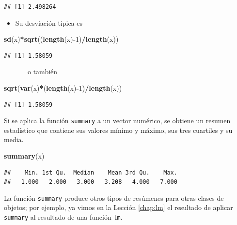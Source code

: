 \documentclass[]{book}
\newenvironment{Shaded}{\begin{snugshade}}{\end{snugshade}}
\newcommand{\DecValTok}[1]{\textcolor[rgb]{0.00,0.00,0.81}{#1}}
\newcommand{\KeywordTok}[1]{\textcolor[rgb]{0.13,0.29,0.53}{\textbf{#1}}}
\newcommand{\NormalTok}[1]{#1}
\newcommand{\OperatorTok}[1]{\textcolor[rgb]{0.81,0.36,0.00}{\textbf{#1}}}
\providecommand{\tightlist}{%
  \setlength{\itemsep}{0pt}\setlength{\parskip}{0pt}}
\theoremstyle{definition}
\theoremstyle{definition}
\theoremstyle{definition}
\theoremstyle{remark}
\begin{document}
\begin{verbatim}
## [1] 2.498264
\end{verbatim}

\begin{itemize}
\tightlist
\item
  Su desviación típica es
\end{itemize}

\begin{Shaded}
\begin{Highlighting}[]
\KeywordTok{sd}\NormalTok{(x)}\OperatorTok{*}\KeywordTok{sqrt}\NormalTok{((}\KeywordTok{length}\NormalTok{(x)}\OperatorTok{-}\DecValTok{1}\NormalTok{)}\OperatorTok{/}\KeywordTok{length}\NormalTok{(x))}
\end{Highlighting}
\end{Shaded}

\begin{verbatim}
## [1] 1.58059
\end{verbatim}

~~~~~~~o también

\begin{Shaded}
\begin{Highlighting}[]
\KeywordTok{sqrt}\NormalTok{(}\KeywordTok{var}\NormalTok{(x)}\OperatorTok{*}\NormalTok{(}\KeywordTok{length}\NormalTok{(x)}\OperatorTok{-}\DecValTok{1}\NormalTok{)}\OperatorTok{/}\KeywordTok{length}\NormalTok{(x))}
\end{Highlighting}
\end{Shaded}

\begin{verbatim}
## [1] 1.58059
\end{verbatim}

Si se aplica la función \texttt{summary} a un vector numérico, se obtiene un resumen estadístico que contiene sus valores mínimo y máximo, sus tres cuartiles y su media.

\begin{Shaded}
\begin{Highlighting}[]
\KeywordTok{summary}\NormalTok{(x)}
\end{Highlighting}
\end{Shaded}

\begin{verbatim}
##    Min. 1st Qu.  Median    Mean 3rd Qu.    Max. 
##   1.000   2.000   3.000   3.208   4.000   7.000
\end{verbatim}

La función \texttt{summary} produce otros tipos de resúmenes para otras clases de objetos; por ejemplo, ya vimos en la Lección \ref{chap:lm} el resultado de aplicar \texttt{summary} al resultado de una función \texttt{lm}.
\end{document}
